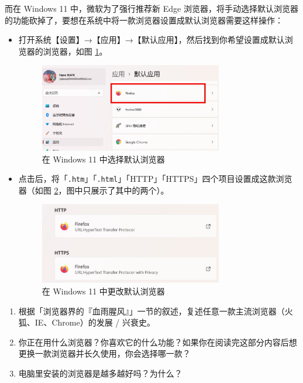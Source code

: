 而在 Windows 11 中，微软为了强行推荐新 Edge 浏览器，将手动选择默认浏览器的功能砍掉了，要想在系统中将一款浏览器设置成默认浏览器需要这样操作：

\begin{itemize}
  \item 打开系统【设置】→【应用】→【默认应用】，然后找到你希望设置成默认浏览器的浏览器，如图 \ref{Windows_11_default_browser}。
    \begin{figure}[htb!]
      \centering
      \includegraphics[width=8cm]{assets/Windows_11_default_browser.jpg}
      \caption{在 Windows 11 中选择默认浏览器}
      \label{Windows_11_default_browser}
    \end{figure}
  \item 点击后，将「\verb|.htm|」「\verb|.html|」「HTTP」「HTTPS」四个项目设置成这款浏览器（如图 \ref{Win_11_Change_Browser}，图中只展示了其中的两个）。
    \begin{figure}[htb!]
      \centering
      \includegraphics[width=8cm]{assets/Win_11_Change_Browser.jpg}
      \caption{在 Windows 11 中更改默认浏览器}
      \label{Win_11_Change_Browser}
    \end{figure}
\end{itemize}

\practice

\begin{enumerate}
  \item 根据「浏览器界的『血雨腥风』」一节的叙述，复述任意一款主流浏览器（火狐、IE、Chrome）的发展 / 兴衰史。
  \item 你正在用什么浏览器？你喜欢它的什么功能？如果你在阅读完这部分内容后想更换一款浏览器并长久使用，你会选择哪一款？
  \item 电脑里安装的浏览器是越多越好吗？为什么？
\end{enumerate}